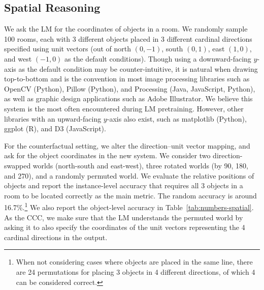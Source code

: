 \subsection{Spatial Reasoning} \label{sec:spatial-setup}

We ask the LM for the coordinates of objects in a room.
We randomly sample 100 rooms, each with 3 different objects placed in 3 different cardinal directions specified using unit vectors (out of north $(0, -1)$, south $(0, 1)$, east $(1, 0)$, and west $(-1, 0)$ as the default conditions). Though using a downward-facing $y$-axis as the default condition may be counter-intuitive, it is natural when drawing top-to-bottom and is the convention in most image processing libraries such as OpenCV (Python), Pillow (Python), and Processing (Java, JavaScript, Python), as well as graphic design applications such as Adobe Illustrator. We believe this system is the most often encountered during LM pretraining. However, other libraries with an upward-facing $y$-axis also exist, such as matplotlib (Python), ggplot (R), and D3 (JavaScript).

For the counterfactual setting, we alter the direction--unit vector mapping, and ask for the object coordinates in the new system. We consider two direction-swapped worlds (north-south and east-west), three rotated worlds (by 90\textdegree, 180\textdegree, and 270\textdegree), and a randomly permuted world. We evaluate the relative positions of objects and report the instance-level accuracy that requires all 3 objects in a room to be located correctly as the main metric. The random accuracy is around 16.7\%.\footnote{When not considering cases where objects are placed in the same line, there are 24 permutations for placing 3 objects in 4 different directions, of which 4 can be considered correct.} We also report the object-level accuracy in Table~\ref{tab:numbers-spatial}.
As the CCC, we make sure that the LM understands the permuted world by asking it to also specify the coordinates of the unit vectors representing the 4 cardinal directions in the output.
